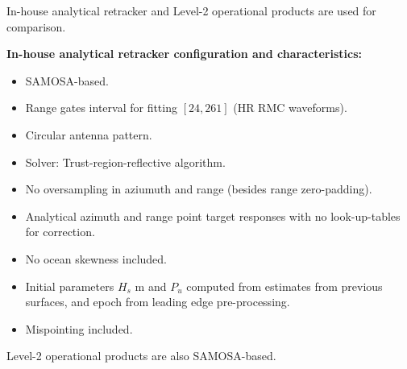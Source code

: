 \documentclass[compress,8pt]{beamer}
\begin{document}
\begin{frame}
 
In-house analytical retracker and Level-2 operational products are used for comparison.
  
\medskip

{\bf In-house analytical retracker configuration and characteristics:}

\begin{itemize}
 \item SAMOSA-based.
 
  \item Range gates interval for fitting $[24, 261]$ (HR RMC waveforms).
 
 \item Circular antenna pattern.
 
 \item Solver: Trust-region-reflective algorithm.
 
 \item No oversampling in aziumuth and range (besides range zero-padding).
 
 \item Analytical azimuth and range point target responses with no look-up-tables for correction.
 
 \item No ocean skewness included. %
 
 \item Initial parameters $H_s$ m and $P_u$ computed from estimates from previous surfaces, and epoch from leading edge pre-processing.

 \item Mispointing included.
 
 \end{itemize}

 
 \bigskip 
 
 Level-2 operational products are also SAMOSA-based.
 
\end{frame}




\end{document}

